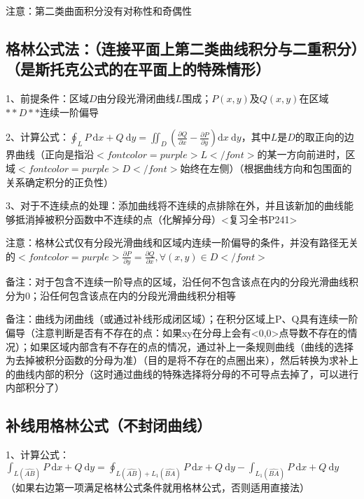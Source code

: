 注意：第二类曲面积分没有对称性和奇偶性



\subsection{格林公式法：（连接平面上第二类曲线积分与二重积分）（是斯托克公式的在平面上的特殊情形）}

1、前提条件：区域$ D $由分段光滑闭曲线$ L $围成；$ P(x, y) $及$ Q(x, y) $在区域$ **D** $连续一阶偏导

2、计算公式：$ \oint_{L} P \mathrm{~d} x+Q \mathrm{~d} y=\iint_{D}\left(\frac{\partial Q}{\partial x}-\frac{\partial P}{\partial y}\right) \mathrm{d} x \mathrm{~d} y $，其中$ L $是$ D $的取正向的边界曲线（正向是指沿$ <font color=purple>L</font> $的某一方向前进时，区域$ <font color=purple>D</font> $始终在左侧）（根据曲线方向和包围面的关系确定积分的正负性）

3、对于不连续点的处理：添加曲线将不连续的点排除在外，并且该新加的曲线能够抵消掉被积分函数中不连续的点（化解掉分母）<复习全书P241>

注意：格林公式仅有分段光滑曲线和区域内连续一阶偏导的条件，并没有路径无关的$ <font color=purple>\frac{\partial P}{\partial y}=\frac{\partial Q}{\partial x}, \forall(x, y) \in D</font> $

备注：对于包含不连续一阶导点的区域，沿任何不包含该点在内的分段光滑曲线积分为0；沿任何包含该点在内的分段光滑曲线积分相等

备注：曲线为闭曲线（或通过补线形成闭区域）；在积分区域上P、Q具有连续一阶偏导（注意判断是否有不存在的点：如果xy在分母上会有<0,0>点导数不存在的情况）；如果区域内部含有不存在的点的情况，通过补上一条规则曲线（曲线的选择为去掉被积分函数的分母为准）（目的是将不存在的点圈出来），然后转换为求补上的曲线内部的积分（这时通过曲线的特殊选择将分母的不可导点去掉了，可以进行内部积分了）



\subsection{补线用格林公式（不封闭曲线）}

1、计算公式：$ \int_{L(\widehat{A B})} P \mathrm{~d} x+Q \mathrm{~d} y=\oint_{L(\widehat{A B})+L_{1}(\widehat{B A})} P \mathrm{~d} x+Q \mathrm{~d} y-\int_{L_{1}(\widehat{BA})} P \mathrm{~d} x+Q \mathrm{~d} y $（如果右边第一项满足格林公式条件就用格林公式，否则适用直接法）



